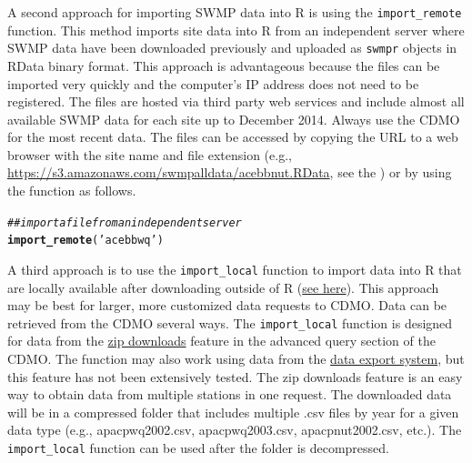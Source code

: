 \documentclass[10pt,letterpaper]{article}\usepackage[]{graphicx}\usepackage[]{color}
\makeatletter
\newcommand{\hlstr}[1]{\textcolor[rgb]{0.192,0.494,0.8}{#1}}%
\newcommand{\hlcom}[1]{\textcolor[rgb]{0.678,0.584,0.686}{\textit{#1}}}%
\newcommand{\hlstd}[1]{\textcolor[rgb]{0.345,0.345,0.345}{#1}}%
\newcommand{\hlkwd}[1]{\textcolor[rgb]{0.737,0.353,0.396}{\textbf{#1}}}%
\newenvironment{kframe}{%
 \def\at@end@of@kframe{}%
 \ifinner\ifhmode%
  \def\at@end@of@kframe{\end{minipage}}%
  \begin{minipage}{\columnwidth}%
 \fi\fi%
 \def\FrameCommand##1{\hskip\@totalleftmargin \hskip-\fboxsep
 \colorbox{shadecolor}{##1}\hskip-\fboxsep
     \hskip-\linewidth \hskip-\@totalleftmargin \hskip\columnwidth}%
 \MakeFramed {\advance\hsize-\width
   \@totalleftmargin\z@ \linewidth\hsize
   \@setminipage}}%
 {\par\unskip\endMakeFramed%
 \at@end@of@kframe}
\newenvironment{knitrout}{}{} %
\makeatother
\begin{document}
A second approach for importing \ac{SWMP} data into R is using the \texttt{import\_remote} function.  This method imports site data into R from an independent server where \ac{SWMP} data have been downloaded previously and uploaded as \texttt{swmpr} objects in RData binary format.  This approach is advantageous because the files can be imported very quickly and the computer's IP address does not need to be registered.  The files are hosted via third party web services and include almost all available \ac{SWMP} data for each site up to December 2014.  Always use the \ac{CDMO} for the most recent data.  The files can be accessed by copying the URL to a web browser with the site name and file extension (e.g., \href{https://s3.amazonaws.com/swmpalldata/acebbnut.RData}{https://s3.amazonaws.com/swmpalldata/acebbnut.RData}, see the ) or by using the function as follows.

\begin{knitrout}
\color{fgcolor}\begin{kframe}
\begin{alltt}
\hlcom{## import a file from an independent server}
\hlkwd{import_remote}\hlstd{(}\hlstr{'acebbwq'}\hlstd{)}
\end{alltt}
\end{kframe}
\end{knitrout}

A third approach is to use the \texttt{import\_local} function to import data into R that are locally available after downloading outside of R (\href{http://cdmo.baruch.sc.edu/get/landing.cfm}{see here}).  This approach may be best for larger, more customized data requests to \ac{CDMO}. Data can be retrieved from the \ac{CDMO} several ways.  The \texttt{import\_local} function is designed for data from the \href{http://cdmo.baruch.sc.edu/aqs/zips.cfm}{zip downloads} feature in the advanced query section of the \ac{CDMO}. The function may also work using data from the \href{http://cdmo.baruch.sc.edu/get/export.cfm}{data export system}, but this feature has not been extensively tested.  The zip downloads feature is an easy way to obtain data from multiple stations in one request.  The downloaded data will be in a compressed folder that includes multiple .csv files by year for a given data type (e.g., apacpwq2002.csv, apacpwq2003.csv, apacpnut2002.csv, etc.).  The \texttt{import\_local} function can be used after the folder is decompressed.
\end{document}
